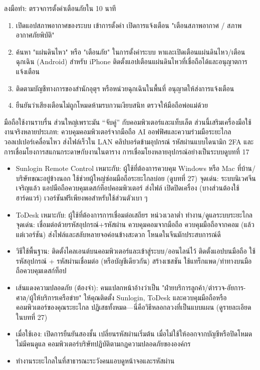 \begin{tcbpractice}{ลงมือทำ: ตรวจการตั้งค่าเตือนภัยใน 10 นาที}
\begin{enumerate}
  \item เปิดแอปสภาพอากาศของระบบ เข้าการตั้งค่า เปิดการแจ้งเตือน "เตือนสภาพอากาศ / สภาพอากาศภัยพิบัติ"
  \item ค้นหา "แผ่นดินไหว" หรือ "เตือนภัย" ในการตั้งค่าระบบ หาและเปิดเตือนแผ่นดินไหว/เตือนฉุกเฉิน (Android) สำหรับ iPhone ติดตั้งแอปเตือนแผ่นดินไหวที่เชื่อถือได้และอนุญาตการแจ้งเตือน
  \item ติดตามบัญชีทางการของสำนักอุตุฯ หรือหน่วยฉุกเฉินในพื้นที่ อนุญาตให้ส่งการแจ้งเตือน
  \item ยืนยันว่าเสียงเตือนไม่ถูกโหมดห้ามรบกวนเงียบสนิท ตรวจให้มือถือพ่อแม่ด้วย
\end{enumerate}

\end{tcbpractice}


มือถือใช้งานราบรื่น ส่วนใหญ่เพราะมัน “จับคู่” กับคอมพิวเตอร์และแท็บเล็ต ส่วนนี้เสริมเครื่องมือใช้งานจริงหลายประเภท: ควบคุมคอมพิวเตอร์จากมือถือ AI ออฟฟิศและความร่วมมือระยะไกล วอลเปเปอร์เคลื่อนไหว ส่งไฟล์เร็วใน LAN คลิปบอร์ดข้ามอุปกรณ์ รหัสผ่านแบบไดนามิก 2FA และการเชื่อมโยงการสแกนกระดาษกับงานในตาราง การเชื่อมโยงหลายอุปกรณ์อย่างเป็นระบบดูบทที่ 17


\begin{itemize}
  \item Sunlogin Remote Control เหมาะกับ: ผู้ใช้ที่ต้องการควบคุม Windows หรือ Mac ที่บ้าน/บริษัทขณะอยู่ข้างนอก ใช้ช่วยผู้ใหญ่ซ่อมมือถือระยะไกลบ่อย (ดูบทที่ 27) จุดเด่น: ระบบนิเวศจีนเจริญแล้ว แอปมือถือควบคุมเดสก์ท็อปคอมพิวเตอร์ ส่งไฟล์ เปิดปิดเครื่อง (บางส่วนต้องใช้ฮาร์ดแวร์) เวอร์ชันฟรีเพียงพอสำหรับใช้ส่วนตัวเบา ๆ
  \item ToDesk เหมาะกับ: ผู้ใช้ที่ต้องการการเชื่อมต่อเสถียร หน่วงเวลาต่ำ ทำงาน/ดูแลระบบระยะไกล จุดเด่น: เชื่อมต่อด้วยรหัสอุปกรณ์+รหัสผ่าน ควบคุมคอมจากมือถือ ควบคุมมือถือจากคอม (แล้วแต่เวอร์ชัน) ส่งไฟล์และสลับหลายจอค่อนข้างสะดวก โหนดในจีนมักประสบการณ์ดี
  \item วิธีใช้พื้นฐาน: ติดตั้งไคลเอนต์บนคอมพิวเตอร์และเข้าสู่ระบบ/ออนไลน์ไว้ ติดตั้งแอปบนมือถือ ใช้รหัสอุปกรณ์ + รหัสผ่านเชื่อมต่อ (หรือบัญชีเดียวกัน) สร้างเซสชัน ใช้แทร็กแพด/ท่าทางบนมือถือควบคุมเดสก์ท็อป
  \item เส้นแดงความปลอดภัย (ต้องจำ): คนแปลกหน้าอ้างว่าเป็น "ฝ่ายบริการลูกค้า/ตำรวจ-อัยการ-ศาล/ผู้ให้บริการเครือข่าย" ให้คุณติดตั้ง Sunlogin, ToDesk และควบคุมมือถือหรือคอมพิวเตอร์ของคุณระยะไกล ปฏิเสธทั้งหมด—นี่คือวิธีหลอกลวงที่เป็นแบบแผน (ดูรายละเอียดในบทที่ 27)
  \item เมื่อใช้เอง: เปิดการยืนยันสองชั้น เปลี่ยนรหัสผ่านเริ่มต้น เมื่อไม่ใช้ให้ออกจากบัญชีหรือปิดโหมดไม่มีคนดูแล คอมพิวเตอร์บริษัทปฏิบัติตามกฎความปลอดภัยขององค์กร
  \item ทำงานระยะไกลในที่สาธารณะระวังคนแอบดูหน้าจอและรหัสผ่าน
\end{itemize}

